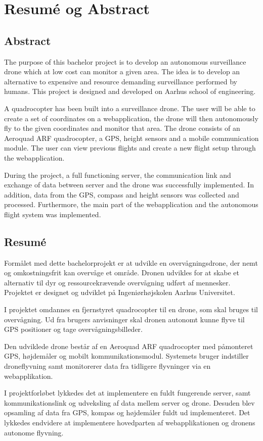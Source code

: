 \chapter{Resumé og Abstract}
\label{chap:resume}


\section*{Abstract}

The purpose of this bachelor project is to develop an autonomous surveillance drone which at low cost can monitor a given area. The idea is to develop an alternative to expensive and resource demanding surveillance performed by humans. This project is designed and developed on Aarhus school of engineering. 

A quadrocopter has been built into a surveillance drone. The user will be able to create a set of coordinates on a webapplication, the drone will then autonomously fly to the given coordinates and monitor that area. 
The drone consists of an Aeroquad ARF quadrocopter, a GPS, height sensors and a mobile communication module. 
The user can view previous flights and create a new flight setup through the webapplication.

During the project, a full functioning server, the communication link and exchange of data between server and the drone was successfully implemented. In addition, data from the GPS, compass and height sensors was collected and processed. Furthermore, the main part of the webapplication and the autonomous flight system was implemented.




\section*{Resumé}

Formålet med dette bachelorprojekt er at udvikle en overvågningsdrone, der nemt og omkostningsfrit kan overvåge et område. Dronen udvikles for at skabe et alternativ til dyr og ressourcekrævende overvågning udført af mennesker.
Projektet er designet og udviklet på Ingeniørhøjskolen Aarhus Universitet.

I projektet omdannes en fjernstyret quadrocopter til en drone, som skal bruges til overvågning. Ud fra brugers anvisninger skal dronen autonomt kunne flyve til GPS positioner og tage overvågningsbilleder.  

Den udviklede drone består af en Aeroquad ARF quadrocopter med påmonteret GPS, højdemåler og mobilt kommunikationsmodul. Systemets bruger indstiller droneflyvning samt monitorerer data fra tidligere flyvninger via en webapplikation.  

I projektforløbet lykkedes det at implementere en fuldt fungerende server, samt kommunikationslink og udveksling af data mellem server og drone. Desuden blev opsamling af data fra GPS, kompas og højdemåler fuldt ud implementeret. Det lykkedes endvidere at implementere hovedparten af webapplikationen og dronens autonome flyvning.





